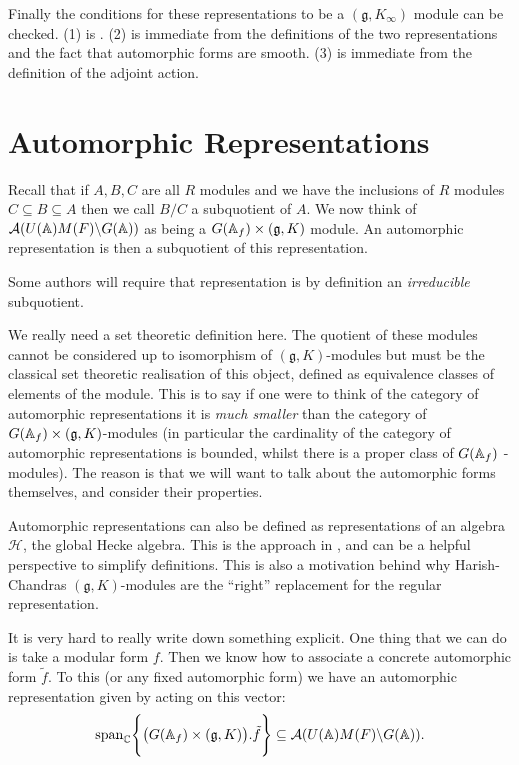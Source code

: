 Finally the conditions for these representations to be a \((\mathfrak{g}, K_\infty)\) module can be checked. (1) is \cite[Thm. 6.3.4]{getzIntroductionAutomorphicRepresentations2024}. (2) is immediate from the definitions of the two representations and the fact that automorphic forms are smooth. (3) is immediate from the definition of the adjoint action.


\section{Automorphic Representations}
Recall that if \(A, B, C\) are all \(R\) modules and we have the inclusions of \(R\) modules \(C \subseteq B \subseteq A\) then we call \(B/C\) a subquotient of \(A\). We now think of \(\mathcal{A}(U(\A)M(F)\backslash G(\A))\) as being a \(G(\A_f)\times (\mathfrak{g}, K)\) module. An automorphic representation is then a subquotient of this representation.
\begin{remark}
    Some authors will require that representation is by definition an \textit{irreducible} subquotient.
\end{remark}
\begin{remark}
    We really need a set theoretic definition here. The quotient of these modules cannot be considered up to isomorphism of \((\mathfrak{g}, K)\)-modules but must be the classical set theoretic realisation of this object, defined as equivalence classes of elements of the module. This is to say if one were to think of the category of automorphic representations it is \textit{much smaller} than the category of \(G(\A_f)\times (\mathfrak{g}, K)\)-modules (in particular the cardinality of the category of automorphic representations is bounded, whilst there is a proper class of \(G(\A_f)\) -modules). The reason is that we will want to talk about the automorphic forms themselves, and consider their properties.
\end{remark}

\begin{remark}
    Automorphic representations can also be defined as representations of an algebra \(\mathcal{H}\), the global Hecke algebra. This is the approach in \cite[I.II(4.6)]{borelAutomorphicFormsRepresentations1979}, and can be a helpful perspective to simplify definitions. This is also a motivation behind why Harish-Chandras \((\mathfrak{g}, K)\)-modules are the ``right'' replacement for the regular representation. 
\end{remark}

\begin{example}
    It is very hard to really write down something explicit. One thing that we can do is take a modular form \(f\). Then we know how to associate a concrete automorphic form \(\tilde{f}\). To this (or any fixed automorphic form) we have an automorphic representation given by acting on this vector:
    \[\mathrm{span}_\C \Biggl\{\big(G(\A_f)\times (\mathfrak{g}, K)\big).\tilde{f}\Biggr\} \subseteq \mathcal{A}(U(\A)M(F)\backslash G(\A)).\]
\end{example}

